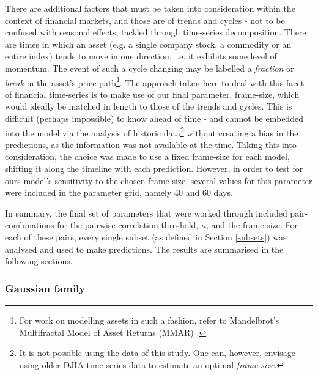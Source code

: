 \documentclass{article}
\begin{document}
There are additional factors that must be taken into consideration within the context of financial markets, and those are of trends and cycles - not to be confused with seasonal effects, tackled through time-series decomposition. There are times in which an asset (e.g. a single company stock, a commodity or an entire index) tends to move in one direction, i.e. it exhibits some level of momentum. The event of such a cycle changing may be labelled a \emph{fraction} or \emph{break} in the asset's price-path\footnote{For work on modelling assets in such a fashion, refer to Mandelbrot's Multifractal Model of Asset Returns (MMAR) \cite{mandelbrot1997multifractal} \cite{calvet1997large} \cite{fisher1997multifractality}.}. The approach taken here to deal with this facet of financial time-series is to make use of our final parameter, frame-size, which would ideally be matched in length to those of the trends and cycles. This is difficult (perhaps impossible) to know ahead of time - and cannot be embedded into the model via the analysis of historic data\footnote{It is not possible using the data of this study. One can, however, envisage using older DJIA time-series data to estimate an optimal \emph{frame-size}.} without creating a bias in the predictions, as the information was not available at the time. Taking this into consideration, the choice was made to use a fixed frame-size for each model, shifting it along the timeline with each prediction. However, in order to test for ours model's sensitivity to the chosen frame-size, several values for this parameter were included in the parameter grid, namely 40 and 60 days.

In summary, the final set of parameters that were worked through included pair-combinations for the pairwise correlation threshold, $\kappa$, and the frame-size. For each of these pairs, every single subset (as defined in Section \ref{subsets}) was analysed and used to make predictions. The results are summarised in the following sections.   


\subsubsection{Gaussian family  \label{results-gauss}}
\label{sec-1-4-2}
\end{document}
